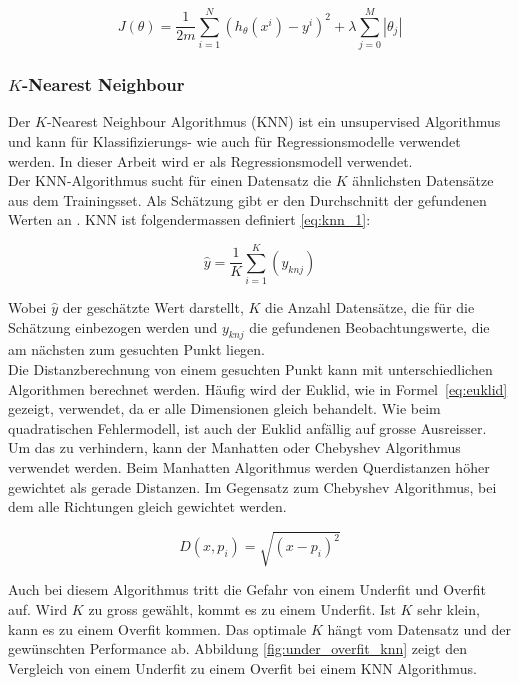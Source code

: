\begin{equation}\label{eq:lasso}
J(\theta) = \frac{1}{2m} \sum_{i=1}^{N} (h_\theta(x^i) - y^i)^2 + \lambda \sum_{j=0}^{M} |\theta_j|
\end{equation}

\subsubsection{$K$-Nearest Neighbour}
Der $K$-Nearest Neighbour Algorithmus (KNN) ist ein unsupervised Algorithmus und kann für Klassifizierungs- wie auch für Regressionsmodelle verwendet werden. In dieser Arbeit wird er als Regressionsmodell verwendet.\\
Der KNN-Algorithmus sucht für einen Datensatz die $K$ ähnlichsten Datensätze aus dem Trainingsset. Als Schätzung gibt er den Durchschnitt der gefundenen Werten an \cite{knn_1}. KNN ist folgendermassen definiert \eqref{eq:knn_1}:

\begin{equation}\label{eq:knn_1}
\hat{y} = \frac{1}{K} \sum_{i=1}^{K} (y_{knj})
\end{equation}

Wobei $\hat{y}$ der geschätzte Wert darstellt, $K$ die Anzahl Datensätze, die für die Schätzung einbezogen werden und $y_{knj}$ die gefundenen Beobachtungswerte, die am nächsten zum gesuchten Punkt liegen.\\
Die Distanzberechnung von einem gesuchten Punkt kann mit unterschiedlichen Algorithmen berechnet werden. Häufig wird der Euklid, wie in Formel~\eqref{eq:euklid} gezeigt, verwendet, da er alle Dimensionen gleich behandelt. Wie beim quadratischen Fehlermodell, ist auch der Euklid anfällig auf grosse Ausreisser. Um das zu verhindern, kann der Manhatten oder Chebyshev Algorithmus verwendet werden. Beim Manhatten Algorithmus werden Querdistanzen höher gewichtet als gerade Distanzen. Im Gegensatz zum Chebyshev Algorithmus, bei dem alle Richtungen gleich gewichtet werden.

\begin{equation}\label{eq:euklid}
D(x, p_i) = \sqrt{(x - p_i)^2}
\end{equation}

Auch bei diesem Algorithmus tritt die Gefahr von einem Underfit und Overfit auf. Wird $K$ zu gross gewählt, kommt es zu einem Underfit. Ist $K$ sehr klein, kann es zu einem Overfit kommen. Das optimale $K$ hängt vom Datensatz und der gewünschten Performance ab. Abbildung \ref{fig:under_overfit_knn} zeigt den Vergleich von einem Underfit zu einem Overfit bei einem KNN Algorithmus.

